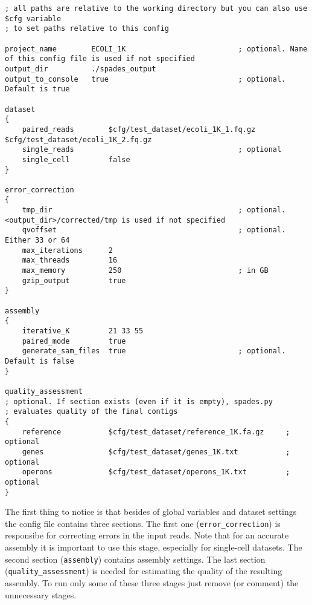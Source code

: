 \documentclass{article}
\def\spades{SPAdes}
\begin{document}
\begin{lstlisting}													
; all paths are relative to the working directory but you can also use $cfg variable 
; to set paths relative to this config

project_name        ECOLI_1K                          ; optional. Name of this config file is used if not specified
output_dir          ./spades_output
output_to_console   true                              ; optional. Default is true

dataset
{
    paired_reads        $cfg/test_dataset/ecoli_1K_1.fq.gz $cfg/test_dataset/ecoli_1K_2.fq.gz
    single_reads                                      ; optional
    single_cell         false
}

error_correction
{
    tmp_dir                                           ; optional. <output_dir>/corrected/tmp is used if not specified
    qvoffset                                          ; optional. Either 33 or 64
    max_iterations      2
    max_threads         16
    max_memory          250                           ; in GB
    gzip_output         true
}

assembly
{
    iterative_K         21 33 55
    paired_mode         true
    generate_sam_files  true                          ; optional. Default is false
}

quality_assessment      
; optional. If section exists (even if it is empty), spades.py 
; evaluates quality of the final contigs
{
    reference           $cfg/test_dataset/reference_1K.fa.gz     ; optional
    genes               $cfg/test_dataset/genes_1K.txt           ; optional
    operons             $cfg/test_dataset/operons_1K.txt         ; optional
}
\end{lstlisting}

The first thing to notice is that besides of global variables and dataset settings 
the config file contains three sections. The first one ({\tt error\_correction}) is responsibe for correcting errors in the input reads.
Note that for an accurate assembly it is important to use this stage, especially
for single-cell datasets.
The second section ({\tt assembly}) 
contains assembly settings.
The last section ({\tt quality\_assessment})
is needed for estimating the quality of the resulting assembly.
To run only some of these three stages just remove (or comment) the unnecessary stages.

\end{document}
